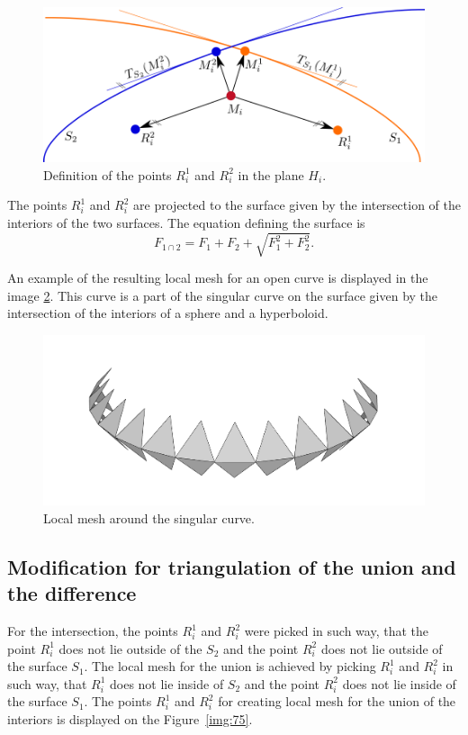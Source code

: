 \begin{figure}[h!]
    \centerline{\includegraphics[scale=0.5]{images/img39}}
    \caption[Definition of the points]
    {Definition of the points $R_i^1$ and $R_i^2$ in the plane $H_i$.}
    \label{img:39}
\end{figure}

The points $R_i^1$ and $R_i^2$ are projected to the surface given by the intersection
of the interiors of the two surfaces. The equation defining the surface is 
$$F_{1 \cap 2} = F_1 + F_2 + \sqrt{F_1^2+F_2^2}.$$

An example of the resulting local mesh for an open curve is displayed in the image
\ref{img:local-mesh-sing-curve}. This curve is a part of the singular curve on the surface 
given by the intersection of the interiors of a sphere and a hyperboloid.

\begin{figure}[h!]
    \centerline{\includegraphics[scale=0.3]{images/local-mesh-sing-curve}}
    \caption[Local mesh around the singular curve]
    {Local mesh around the singular curve.}
    \label{img:local-mesh-sing-curve}
\end{figure}

\subsection{Modification for triangulation of the union and the difference}
For the intersection, the points $R_i^1$ and $R_i^2$ were picked in such way, that the point
$R_i^1$ does not lie outside of the $S_2$ and the point $R_i^2$ does not lie outside of 
the surface $S_1$. The local mesh for the union is achieved by picking $R_i^1$ and $R_i^2$
in such way, that $R_i^1$ does not lie inside of $S_2$ and the point $R_i^2$ does not lie 
inside of the surface $S_1$. The points $R_i^1$ and $R_i^2$ for creating local mesh for 
the union of the interiors is displayed on the Figure~\ref{img:75}.

